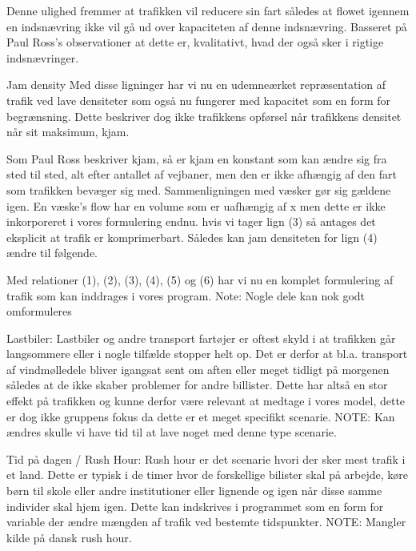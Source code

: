 Denne ulighed fremmer at trafikken vil reducere sin fart således at flowet igennem en indsnævring ikke vil gå ud over kapaciteten af denne indsnævring. Basseret på Paul Ross’s observationer at dette er, kvalitativt, hvad der også sker i rigtige indsnævringer.

Jam density
Med disse ligninger har vi nu en udemneærket repræsentation af trafik ved lave densiteter som også nu fungerer med kapacitet som en form for begrænsning. Dette beskriver dog ikke trafikkens opførsel når trafikkens densitet når sit maksimum, kjam.


Som Paul Ross beskriver kjam, så er kjam en konstant som kan ændre sig fra sted til sted, alt efter antallet af vejbaner, men den er ikke afhængig af den fart som trafikken bevæger sig med. Sammenligningen med væsker gør sig gældene igen. En væske’s flow har en volume som er uafhængig af x men dette er ikke inkorporeret i vores formulering endnu. hvis vi tager lign (3) så antages det eksplicit at trafik er komprimerbart. Således kan jam densiteten for lign (4) ændre til følgende.


Med relationer (1), (2), (3), (4), (5) og (6) har vi nu en komplet formulering af trafik som kan inddrages i vores program.
Note: Nogle dele kan nok godt omformuleres

Lastbiler:
Lastbiler og andre transport fartøjer er oftest skyld i at trafikken går langsommere eller i nogle tilfælde stopper helt op. Det er derfor at bl.a. transport af vindmølledele bliver igangsat sent om aften eller meget tidligt på morgenen således at de ikke skaber problemer for andre billister. Dette har altså en stor effekt på trafikken og kunne derfor være relevant at medtage i vores model, dette er dog ikke gruppens fokus da dette er et meget specifikt scenarie.
NOTE: Kan ændres skulle vi have tid til at lave noget med denne type scenarie.

Tid på dagen / Rush Hour: 
Rush hour er det scenarie hvori der sker mest trafik i et land. Dette er typisk i de timer hvor de forskellige bilister skal på arbejde, køre børn til skole eller andre institutioner eller lignende og igen når disse samme individer skal hjem igen. Dette kan indskrives i programmet som en form for variable der ændre mængden af trafik ved bestemte tidspunkter.
NOTE: Mangler kilde på dansk rush hour.

